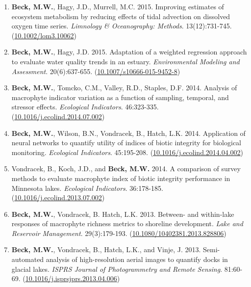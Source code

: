 \documentclass[letterpaper,12pt]{article}
\begin{document}
\begin{enumerate}
\item \textbf{Beck, M.W.}, Hagy, J.D., Murrell, M.C. 2015. Improving estimates of ecosystem metabolism by reducing effects of tidal advection on dissolved oxygen time series. \textit{Limnology \& Oceanography: Methods}. 13(12):731-745. ({\footnotesize\href{http://dx.doi.org/10.1002/lom3.10062}{10.1002/lom3.10062}})

\item \textbf{Beck, M.W.}, Hagy, J.D. 2015. Adaptation of a weighted regression approach to evaluate water quality trends in an estuary. \textit{Environmental Modeling and Assessment}. 20(6):637-655. ({\footnotesize\href{http://dx.doi.org/10.1007/s10666-015-9452-8}{10.1007/s10666-015-9452-8}})

\item \textbf{Beck, M.W.}, Tomcko, C.M., Valley, R.D., Staples, D.F. 2014. Analysis of macrophyte indicator variation as a function of sampling, temporal, and stressor effects. \textit{Ecological Indicators}. 46:323-335. ({\footnotesize\href{https://doi.org/10.1016/j.ecolind.2014.07.002}{10.1016/j.ecolind.2014.07.002}})

\item \textbf{Beck, M.W.}, Wilson, B.N., Vondracek, B., Hatch, L.K. 2014. Application of neural networks to quantify utility of indices of biotic integrity for biological monitoring. \textit{Ecological Indicators}. 45:195-208. ({\footnotesize\href{https://doi.org/10.1016/j.ecolind.2014.04.002}{10.1016/j.ecolind.2014.04.002}})

\item Vondracek, B., Koch, J.D., and \textbf{Beck, M.W.} 2014. A comparison of survey methods to evaluate macrophyte index of biotic integrity performance in Minnesota lakes. \textit{Ecological Indicators}. 36:178-185. ({\footnotesize\href{https://doi.org/10.1016/j.ecolind.2013.07.002}{10.1016/j.ecolind.2013.07.002}})

\item \textbf{Beck, M.W.}, Vondracek, B. Hatch, L.K. 2013. Between- and within-lake responses of macrophyte richness metrics to shoreline development. \textit{Lake and Reservoir Management}. 29(3):179-193. ({\footnotesize\href{http://dx.doi.org/10.1080/10402381.2013.828806}{10.1080/10402381.2013.828806}})

\item \textbf{Beck, M.W.}, Vondracek, B., Hatch, L.K., and Vinje, J. 2013. Semi-automated analysis of high-resolution aerial images to quantify docks in glacial lakes. \textit{ISPRS Journal of Photogrammetry and Remote Sensing}. 81:60-69. ({\footnotesize\href{https://doi.org/10.1016/j.isprsjprs.2013.04.006}{10.1016/j.isprsjprs.2013.04.006}})


\end{enumerate}
\end{document}
